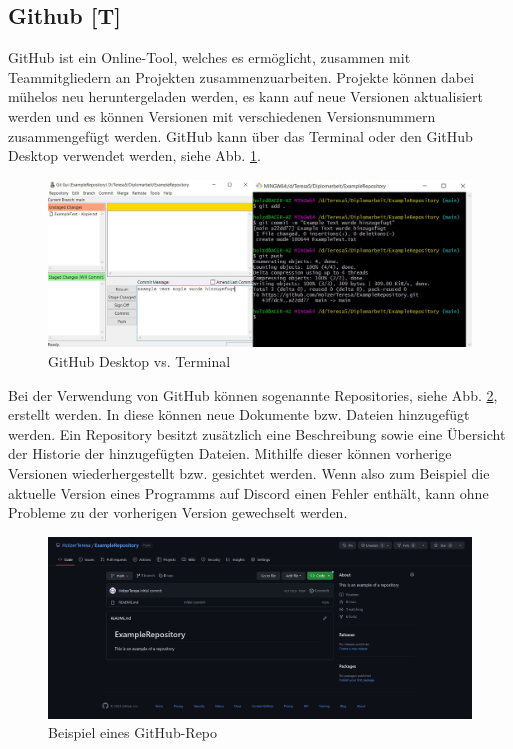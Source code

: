 \subsection{Github [T]} 
GitHub ist ein Online-Tool, welches es ermöglicht, zusammen mit Teammitgliedern an Projekten zusammenzuarbeiten. Projekte können dabei mühelos neu heruntergeladen werden, es kann auf neue Versionen aktualisiert werden und es können Versionen mit verschiedenen Versionsnummern zusammengefügt werden. GitHub kann über das Terminal oder den GitHub Desktop verwendet werden, siehe Abb. \ref{fig:impl:gitHubTerminalVSGUI}.


\begin{figure}[h t]
\centering
\includegraphics[scale=0.45]{pics/githubTerminalGUI.png}
\caption{GitHub Desktop vs. Terminal}
\label{fig:impl:gitHubTerminalVSGUI}
\end{figure}


Bei der Verwendung von GitHub können sogenannte Repositories, siehe Abb. \ref{fig:impl:githubRepository}, erstellt werden. In diese können neue Dokumente bzw. Dateien hinzugefügt werden. Ein Repository besitzt zusätzlich eine Beschreibung sowie eine Übersicht der Historie der hinzugefügten Dateien. Mithilfe dieser können vorherige Versionen wiederhergestellt bzw. gesichtet werden. Wenn also zum Beispiel die aktuelle Version eines Programms auf Discord einen Fehler enthält, kann ohne Probleme zu der vorherigen Version gewechselt werden.




\begin{figure}[h t]
\centering
\includegraphics[scale=0.38]{pics/exampleRepository.jpg}
\caption{Beispiel eines GitHub-Repo}
\label{fig:impl:githubRepository}
\end{figure}

